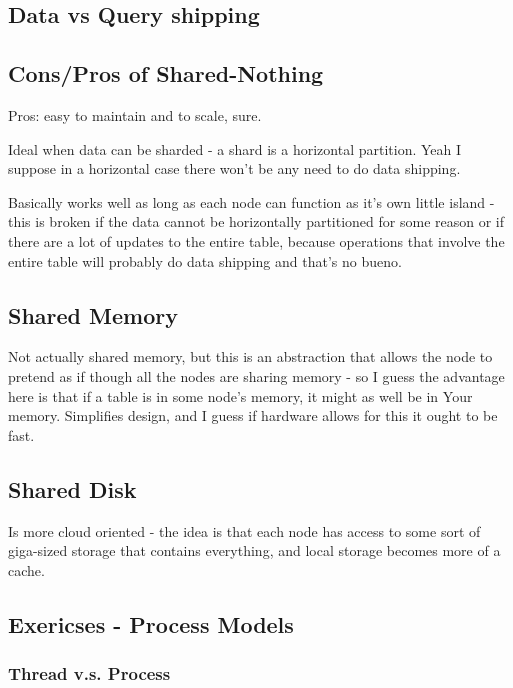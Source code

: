 \documentclass{article}
\begin{document}
	\subsection{Data vs Query shipping}
	
	\subsection{Cons/Pros of Shared-Nothing}
	
		Pros: easy to maintain and to scale, sure.
		
		Ideal when data can be sharded - a shard is a horizontal partition. Yeah I suppose in a horizontal case there won't be any need to do data shipping.
		
		Basically works well as long as each node can function as it's own little island - this is broken if the data cannot be horizontally partitioned for some reason or if there are a lot of updates to the entire table, because operations that involve the entire table will probably do data shipping and that's no bueno.
	
	\subsection{Shared Memory}
	
		Not actually shared memory, but this is an abstraction that allows the node to pretend as if though all the nodes are sharing memory - so I guess the advantage here is that if a table is in some node's memory, it might as well be in Your memory. Simplifies design, and I guess if hardware allows for this it ought to be fast.
	
	\subsection{Shared Disk}
	
		Is more cloud oriented - the idea is that each node has access to some sort of giga-sized storage that contains everything, and local storage becomes more of a cache. 
		
	\subsection{Exericses - Process Models}
	
		\subsubsection{Thread v.s. Process}
		
\end{document}
